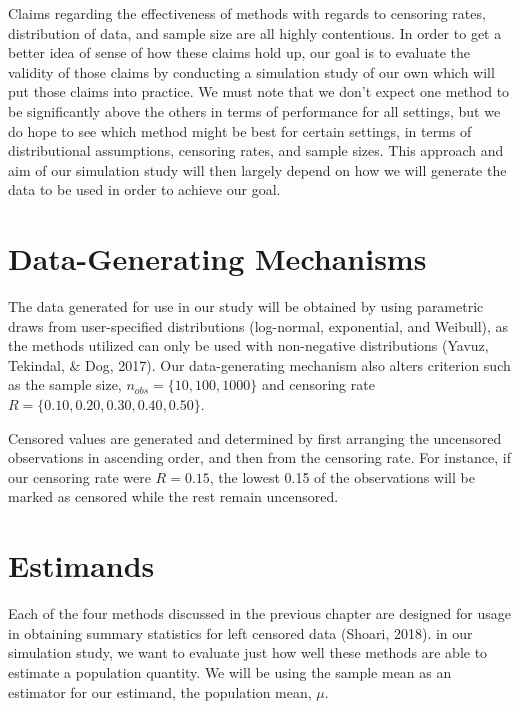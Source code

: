 \documentclass[12pt, twoside]{amherstthesis}
\begin{document}
Claims regarding the effectiveness of methods with regards to censoring rates, distribution of data, and sample size are all highly contentious. In order to get a better idea of sense of how these claims hold up, our goal is to evaluate the validity of those claims by conducting a simulation study of our own which will put those claims into practice. We must note that we don't expect one method to be significantly above the others in terms of performance for all settings, but we do hope to see which method might be best for certain settings, in terms of distributional assumptions, censoring rates, and sample sizes. This approach and aim of our simulation study will then largely depend on how we will generate the data to be used in order to achieve our goal.

\hypertarget{data_generating_mechanisms}{%
\section{Data-Generating Mechanisms}\label{data_generating_mechanisms}}

The data generated for use in our study will be obtained by using parametric draws from user-specified distributions (log-normal, exponential, and Weibull), as the methods utilized can only be used with non-negative distributions (Yavuz, Tekindal, \& Dog, 2017). Our data-generating mechanism also alters criterion such as the sample size, \(n_{obs} = \{10, 100, 1000\}\) and censoring rate \(R = \{0.10, 0.20, 0.30, 0.40, 0.50\}\).

Censored values are generated and determined by first arranging the uncensored observations in ascending order, and then from the censoring rate. For instance, if our censoring rate were \(R = 0.15\), the lowest 0.15 of the observations will be marked as censored while the rest remain uncensored.

\hypertarget{estimands}{%
\section{Estimands}\label{estimands}}

Each of the four methods discussed in the previous chapter are designed for usage in obtaining summary statistics for left censored data (Shoari, 2018). in our simulation study, we want to evaluate just how well these methods are able to estimate a population quantity. We will be using the sample mean as an estimator for our estimand, the population mean, \(\mu\).
\end{document}
